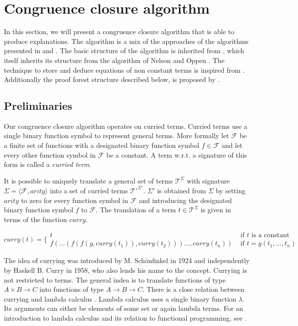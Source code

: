 \section*{Congruence closure algorithm}
\label{sec:algorithm}

In this section, we will present a congruence closure algorithm that is able to produce explanations.
The algorithm is a mix of the approaches of the algorithms presented in \cite{Fontaine2004} and \cite{Nieuwenhuis2005,Nieuwenhuis2007}.
The basic structure of the algorithm is inherited from \cite{Fontaine2004}, which itself inherits its structure from the algorithm of Nelson and Oppen \cite{Nelson1980}.
The technique to store and deduce equations of non constant terms is inspired from \cite{Nieuwenhuis2005,Nieuwenhuis2007}.
Additionally the proof forest structure described below, is proposed by \cite{Nieuwenhuis2005,Nieuwenhuis2007}.

\subsection*{Preliminaries}

Our congruence closure algorithm operates on curried terms.
Curried terms use a single binary function symbol to represent general terms.
More formally let $\mathcal{F}$ be a finite set of functions with a designated binary function symbol $f \in \mathcal{F}$ and let every other function symbol in $\mathcal{F}$ be a constant.
A term w.r.t. a signature of this form is called a \emph{curried term}.

It is possible to uniquely translate a general set of terms $\mathcal{T}^{\Sigma}$ with signature $\Sigma = \langle \mathcal{F},arity \rangle$ into a set of curried terms $\mathcal{T'}^{\Sigma'}$.
$\Sigma'$ is obtained from $\Sigma$ by setting $arity$ to zero for every function symbol in $\mathcal{F}$ and introducing the designated binary function symbol $f$ to $\mathcal{F}$.
The translation of a term $t \in \mathcal{T}^{\Sigma}$ is given in terms of the function $curry$.

$$
curry(t) = \Big\{
\begin{array}{ll}
	t & \text{ if } t \text{ is a constant }\\
	f(\ldots (f(f(g,curry(t_1)),curry(t_2)))\ldots,curry(t_n)) &\text{ if } t = g(t_1,\ldots, t_n)
\end{array}
$$

The idea of currying was introduced by M. Sch\"onfinkel \cite{Schoenfinkel1924} in 1924 and independently by Haskell B. Curry \cite{Curry1958} in 1958, who also lends his name to the concept.
Currying is not restricted to terms.
The general indea is to translate functions of type $A \times B \rightarrow C$ into functions of type $A \rightarrow B \rightarrow C$.
There is a close relation between currying and lambda calculus \cite{Church1936}.
Lambda calculus uses a single binary function $\lambda$.
Its arguments can either be elements of some set or again lambda terms.
For an introduction to lambda calculus and its relation to functional programming, see \cite{Barendregt1997}.

